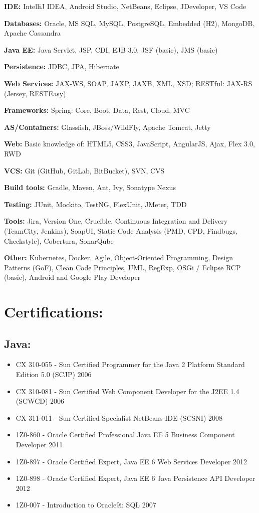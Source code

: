 \documentclass[11pt,a4paper]{article}
\begin{document}
\textbf{IDE:} IntelliJ IDEA, Android Studio, NetBeans, Eclipse, JDeveloper, VS Code

\textbf{Databases:} Oracle, MS SQL, MySQL, PostgreSQL, Embedded (H2), MongoDB, Apache Cassandra

\textbf{Java EE:} Java Servlet, JSP, CDI, EJB 3.0, JSF (basic), JMS (basic)

\textbf{Persistence:} JDBC, JPA, Hibernate

\textbf{Web Services:} JAX-WS, SOAP, JAXP, JAXB, XML, XSD; RESTful: JAX-RS (Jersey, RESTEasy)

\textbf{Frameworks:} Spring: Core, Boot, Data, Rest, Cloud, MVC

\textbf{AS/Containers:} Glassfish, JBoss/WildFly, Apache Tomcat, Jetty

\textbf{Web:} Basic knowledge of: HTML5, CSS3, JavaScript, AngularJS, Ajax, Flex 3.0, RWD

\textbf{VCS:} Git (GitHub, GitLab, BitBucket), SVN, CVS

\textbf{Build tools:} Gradle, Maven, Ant, Ivy, Sonatype Nexus

\textbf{Testing:} JUnit, Mockito, TestNG, FlexUnit, JMeter, TDD

\textbf{Tools:} Jira, Version One, Crucible, Continuous Integration and Delivery (TeamCity, Jenkins), SoapUI, Static Code Analysis (PMD, CPD, Findbugs, Checkstyle), Cobertura, SonarQube

\textbf{Other:} Kubernetes, Docker, Agile, Object-Oriented Programming, Design Patterns (GoF), Clean Code Principles, UML, RegExp, OSGi / Eclipse RCP (basic), Android and Google Play Developer

\newpage

\section*{Certifications:}

\subsection*{Java:}
\begin{itemize}
    \item CX 310-055 - Sun Certified Programmer for the Java 2 Platform Standard Edition 5.0 (SCJP) 2006
    \item CX 310-081 - Sun Certified Web Component Developer for the J2EE 1.4 (SCWCD) 2006
    \item CX 311-011 - Sun Certified Specialist NetBeans IDE (SCSNI) 2008
    \item 1Z0-860 - Oracle Certified Professional Java EE 5 Business Component Developer 2011
    \item 1Z0-897 - Oracle Certified Expert, Java EE 6 Web Services Developer 2012
    \item 1Z0-898 - Oracle Certified Expert, Java EE 6 Java Persistence API Developer 2012
    \item 1Z0-007 - Introduction to Oracle9i: SQL 2007
\end{itemize}
\end{document}
